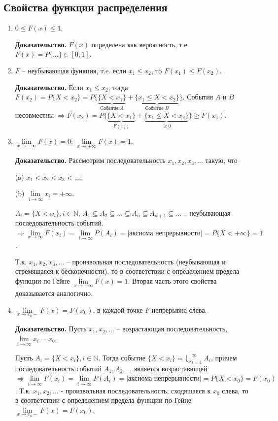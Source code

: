 \subsection*{Свойства функции распределения}
\begin{enumerate}
	\item $0 \leq F(x) \leq 1$.
	
		\textbf{Доказательство.} $F(x)$ определена как вероятность, т.е. $F(x) = P\{...\} \in [0; 1]$.
		
	\item $F$ -- неубывающая функция, т.e. если $x_1 \leq x_2$, то $F(x_1) \leq F(x_2).$
	
		\textbf{Доказательство.} Если $x_1 \leq x_2$, тогда $F(x_2) = P\{X < x_2\} = P\{\underbrace{\{X < x_1\}}_\text{Событие $A$} + \underbrace{\{x_1 \leq X < x_2\}}_\text{Событие $B$}\}$. События $A$ и $B$ несовместны $\Rightarrow F(x_2) = P\{\underbrace{\{X < x_1\}}_\text{$F(x_1)$} + \underbrace{\{x_1 \leq X < x_2\}}_\text{$\geq0$}\} \geq F(x_1)$.  
	
	\item  $\lim\limits_{x \rightarrow -\infty}F(x) = 0$; $\lim\limits_{x \rightarrow +\infty}F(x) = 1$.
	
		\textbf{Доказательство.} Рассмотрим последовательность $x_1, x_2, x_3,...$ такую, что 
		
		(a) $x_1 < x_2 < x_3 < ...$; 
		
		(b) $\lim\limits_{i \rightarrow \infty} x_i = +\infty$.
		
		$A_i = \{X < x_i\}, i \in \mathbb{N}$; $A_1 \subseteq A_2 \subseteq ... \subseteq A_n \subseteq A_{n+1} \subseteq ...$ -- неубывающая последовательность событий. $\Rightarrow \lim\limits_{x \rightarrow \infty} F(x_i) = \lim\limits_{i \rightarrow \infty} P(A_i) = |\text{аксиома непрерывности}| = P\{X < +\infty\} = 1$.
		
		Т.к. $x_1, x_2, x_3,...$ -- произвольная последовательность (неубывающая и стремящаяся к бесконечности), то в соответствии с определением предела функции по Гейне $\lim\limits_{x \rightarrow +\infty}F(x) = 1$. Вторая часть этого свойства доказывается аналогично.
		
	\item $\lim\limits_{x \rightarrow x_0-}F(x) = F(x_0)$, в каждой точке $F$ непрерывна слева.
		
		\textbf{Доказательство.} Пусть $x_1,x_2,...$ -- возрастающая последовательность, $\lim\limits_{i \rightarrow \infty}x_i = x_0$.
		
		Пусть $A_i = \{X < x_i\}, i \in \mathbb{N}$. Тогда событие $\{X < x_i\} = \bigcup_{i=1}^\infty A_i$, причем последовательность событий $A_1,A_2,...$ является возраставющей $\Rightarrow \lim\limits_{i \rightarrow \infty} F(x_i) = \lim\limits_{i \rightarrow \infty} P(A_i) = |\text{аксиома непрерывности}|=P\{X<x_0\} = F(x_0)$. Т.к. $x_1, x_2,...$ - произвольная последовательность, сходящаяся к $x_0$ слева, то в соответствии с определением предела функции по Гейне $\lim\limits_{x \rightarrow x_0-} F(x) = F(x_0)$.
		

\end{enumerate}
